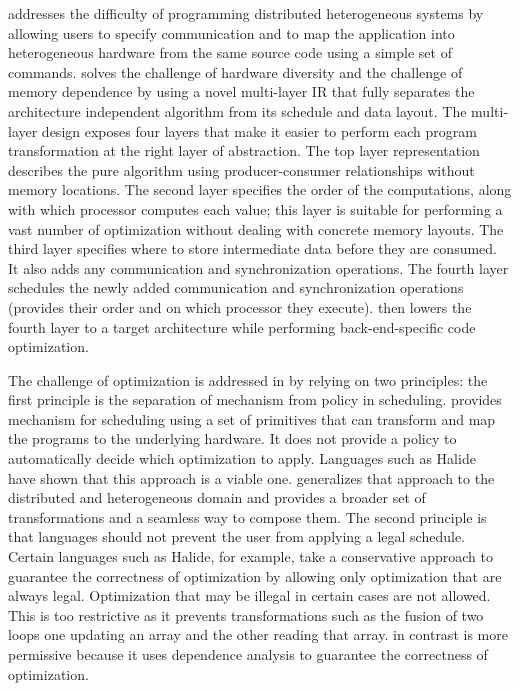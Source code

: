 \framework{} addresses the difficulty of programming distributed heterogeneous systems by allowing users to specify communication and to map the application into heterogeneous hardware from the same source code using a simple set of commands.  \framework{} solves the challenge of hardware diversity and the challenge of memory dependence by using a novel multi-layer IR that fully separates the architecture independent algorithm from its schedule and data layout.
The multi-layer design exposes four layers that make it easier to perform each program transformation at the right layer of abstraction.
The top layer representation describes the pure algorithm using producer-consumer relationships without memory locations.
The second layer specifies the order of the computations, along with which processor computes each value; this layer is suitable for performing a vast number of optimization without dealing with concrete memory layouts.
The third layer specifies where to store intermediate data before they are consumed.  It also adds any communication and synchronization operations.  The fourth layer schedules the newly added communication and synchronization operations (provides their order and on which processor they execute).
\framework{} then lowers the fourth layer to a target architecture while performing back-end-specific code optimization.

The challenge of optimization is addressed in \framework{} by relying on two principles: the first principle is the separation of mechanism from policy in scheduling.  
\framework{} provides mechanism for scheduling using a set of primitives that can transform and map the programs to the underlying hardware.
It does not provide a policy to automatically decide which optimization to apply.  Languages such as Halide~\cite{halide_12,chill} have shown that this approach is a viable one.  \framework{} generalizes that approach to the distributed and heterogeneous domain and provides a broader set of transformations and a seamless way to compose them.
The second principle is that languages should not prevent the user from applying a legal schedule.  Certain languages such as Halide, for example, take a conservative approach to guarantee the correctness of optimization by allowing only optimization that are always legal.  Optimization that may be illegal in certain cases are not allowed.  This is too restrictive as it prevents transformations such as the fusion of two loops one updating an array and the other reading that array.  \framework{} in contrast is more permissive because it uses dependence analysis to guarantee the correctness of optimization.

